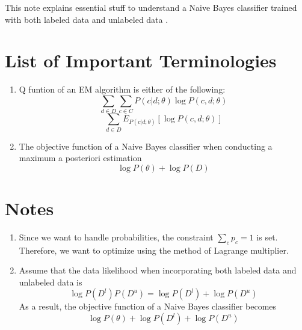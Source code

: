 \documentclass[11pt]{article}
\begin{document}
This note explains essential stuff to understand a Naive Bayes classifier trained with both labeled data and unlabeled data \cite{nigam2000text}.


\section{List of Important Terminologies}
\begin{enumerate}
 \item Q funtion of an EM algorithm is either of the following:
$$\sum_{d \in D} \sum_{c \in C} P(c|d; \theta) \log P(c, d; \theta)$$
$$\sum_{d \in D} E_{P(c|d; \theta)}[ \log P(c, d; \theta)]$$
 \item The objective function of a Naive Bayes classifier when conducting a maximum a posteriori estimation 
$$\log P(\theta) + \log P(D)$$
\end{enumerate}

\section{Notes}
\begin{enumerate}
 \item Since we want to handle probabilities, the constraint $\sum_{c} p_c = 1$ is set. Therefore, we want to optimize using the method of Lagrange multiplier.
 \item Assume that the data likelihood when incorporating both labeled data and unlabeled data is
$$\log P(D^{l})P(D^{u}) =\log P(D^{l}) + \log P(D^{u})$$
As a result, the objective function of a Naive Bayes classifier becomes 
$$\log P(\theta) + \log P(D^{l}) + \log P(D^{u})$$
\end{enumerate}

 



\end{document}

